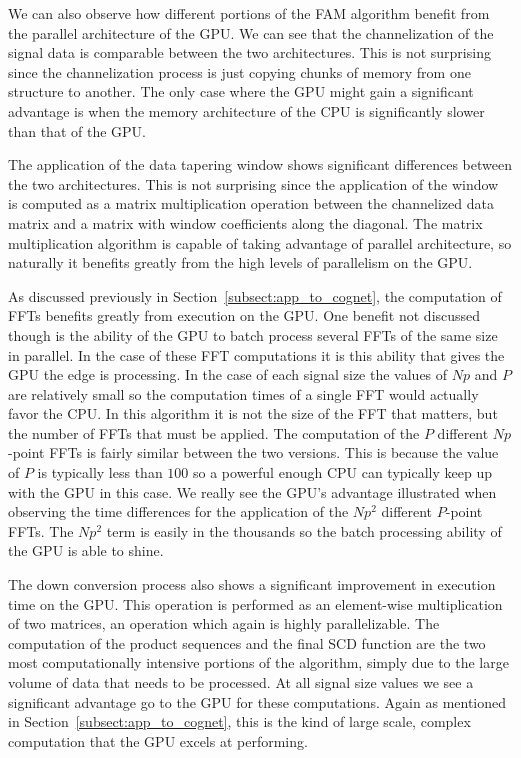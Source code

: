 We can also observe how different portions of the FAM algorithm benefit from the parallel architecture of the GPU.  We can see that the channelization of the signal data is comparable between the two architectures.  This is not surprising since the channelization process is just copying chunks of memory from one structure to another.  The only case where the GPU might gain a significant advantage is when the memory architecture of the CPU is significantly slower than that of the GPU.

The application of the data tapering window shows significant differences between the two architectures.  This is not surprising since the application of the window is computed as a matrix multiplication operation between the channelized data matrix and a matrix with window coefficients along the diagonal.  The matrix multiplication algorithm is capable of taking advantage of parallel architecture, so naturally it benefits greatly from the high levels of parallelism on the GPU.

As discussed previously in Section~\ref{subsect:app_to_cognet}, the computation of FFTs benefits greatly from execution on the GPU.  One benefit not discussed though is the ability of the GPU to batch process several FFTs of the same size in parallel.  In the case of these FFT computations it is this ability that gives the GPU the edge is processing.  In the case of each signal size the values of $Np$ and $P$ are relatively small so the computation times of a single FFT would actually favor the CPU.  In this algorithm it is not the size of the FFT that matters, but the number of FFTs that must be applied.  The computation of the $P$ different $Np$-point FFTs is fairly similar between the two versions.  This is because the value of $P$ is typically less than $100$ so a powerful enough CPU can typically keep up with the GPU in this case.  We really see the GPU's advantage illustrated when observing the time differences for the application of the $Np^2$ different $P$-point FFTs.  The $Np^2$ term is easily in the thousands so the batch processing ability of the GPU is able to shine.

The down conversion process also shows a significant improvement in execution time on the GPU.  This operation is performed as an element-wise multiplication of two matrices, an operation which again is highly parallelizable.  The computation of the product sequences and the final SCD function are the two most computationally intensive portions of the algorithm, simply due to the large volume of data that needs to be processed.  At all signal size values we see a significant advantage go to the GPU for these computations.  Again as mentioned in Section~\ref{subsect:app_to_cognet}, this is the kind of large scale, complex computation that the GPU excels at performing.

